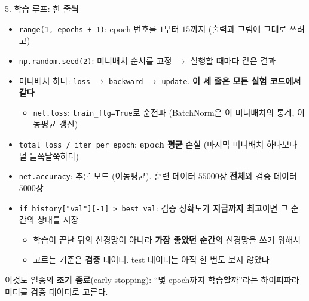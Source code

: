 \documentclass[aspectratio=169,11pt]{beamer}
\newcommand{\code}[1]{\texttt{#1}}
\begin{document}
\begin{frame}[shrink]{5. 학습 루프: 한 줄씩}
\small
\small
\begin{itemize}
\item \code{range(1, epochs + 1)}: epoch 번호를 $1$부터 $15$까지 (출력과 그림에 그대로 쓰려고)
\item \code{np.random.seed(2)}: 미니배치 순서를 고정 $\to$ 실행할 때마다 같은 결과
\item 미니배치 하나: \code{loss} $\to$ \code{backward} $\to$ \code{update}. \textbf{이 세 줄은 모든 실험 코드에서 같다}
\begin{itemize}
\item \code{net.loss}: \code{train\_flg=True}로 순전파 (BatchNorm은 이 미니배치의 통계, 이동평균 갱신)
\end{itemize}
\item \code{total\_loss / iter\_per\_epoch}: \textbf{epoch 평균} 손실 (마지막 미니배치 하나보다 덜 들쭉날쭉하다)
\item \code{net.accuracy}: 추론 모드 (이동평균). 훈련 데이터 $55000$장 \textbf{전체}와 검증 데이터 $5000$장
\item \code{if history["val"][-1] > best\_val}: 검증 정확도가 \textbf{지금까지 최고}이면 그 순간의 상태를 저장
\begin{itemize}
\item 학습이 끝난 뒤의 신경망이 아니라 \textbf{가장 좋았던 순간}의 신경망을 쓰기 위해서
\item 고르는 기준은 \textbf{검증} 데이터. test 데이터는 아직 한 번도 보지 않았다
\end{itemize}
\end{itemize}
\begin{keybox}
\small 이것도 일종의 \textbf{조기 종료}(early stopping): ``몇 epoch까지 학습할까''라는 하이퍼파라미터를 검증 데이터로 고른다.
\end{keybox}
\end{frame}
\end{document}
